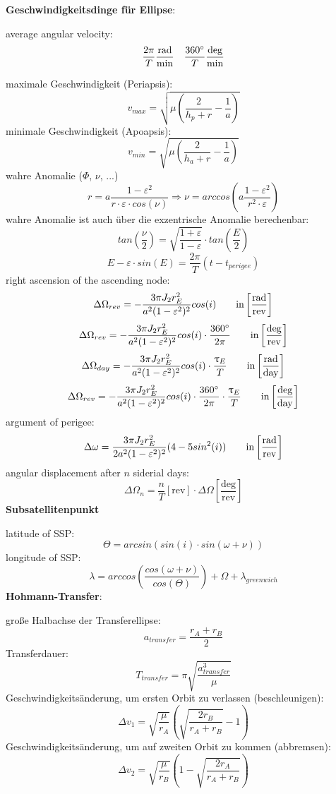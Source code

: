 \documentclass[a4paper,10pt]{article}
\newcommand{\f}{\textbf}
\begin{document}
\noindent \f{Geschwindigkeitsdinge für Ellipse}:\\
\vspace*{3pt}

average angular velocity:
\[ \frac{2\pi}{T} \frac{\text{rad}}{\text{min}} ~~~ \frac{360\degree}{T} \frac{\text{deg}}{\text{min}}\]

\noindent maximale Geschwindigkeit (Periapsis):
\[v_{max} = \sqrt{\mu\left(\frac{2}{h_p+r} -\frac{1}{a}\right)}\]
minimale Geschwindigkeit (Apoapsis):
\[v_{min} = \sqrt{\mu\left(\frac{2}{h_a+r} -\frac{1}{a}\right)}\]
wahre Anomalie ($\Phi$, $\nu$, ...)
\[r = a\frac{1-\varepsilon^2}{r\cdot \varepsilon \cdot cos(\nu)} \Rightarrow \nu = arccos\left(a\frac{1-\varepsilon^2}{r^2\cdot \varepsilon}\right)\]
wahre Anomalie ist auch über die exzentrische Anomalie berechenbar:
\[tan\left(\frac{\nu}{2}\right) = \sqrt{\frac{1+\varepsilon}{1-\varepsilon}}\cdot tan\left(\frac{E}{2}\right)\]
\[E - \varepsilon \cdot sin(E) = \frac{2\pi}{T}(t-t_{perigee})\]
right ascension of the ascending node:
\[\Delta \Omega_{rev} = -\frac{3\pi J_2r_E^2}{a^2(1-\varepsilon^2)^2}cos(i) \text{\qquad  in} \left[\frac{\text{rad}}{\text{rev}}\right]\]
\[\Delta \Omega_{rev} = -\frac{3\pi J_2r_E^2}{a^2(1-\varepsilon^2)^2}cos(i) \cdot \frac{360^{\circ}}{2\pi} \text{\qquad  in} \left[\frac{\text{deg}}{\text{rev}}\right]\]
\[\Delta \Omega_{day} = -\frac{3\pi J_2r_E^2}{a^2(1-\varepsilon^2)^2}cos(i) \cdot \frac{\uptau_E}{T} \text{\qquad  in} \left[\frac{\text{rad}}{\text{day}}\right]\]
\[\Delta \Omega_{rev} = -\frac{3\pi J_2r_E^2}{a^2(1-\varepsilon^2)^2}cos(i) \cdot \frac{360^{\circ}}{2\pi}\cdot \frac{\uptau_E}{T} \text{\qquad  in} \left[\frac{\text{deg}}{\text{day}}\right]\]
argument of perigee:
\[\Delta \omega = \frac{3\pi J_2r_E^2}{2a^2(1-\varepsilon^2)^2}(4-5sin^2(i))\text{\qquad  in} \left[\frac{\text{rad}}{\text{rev}}\right]\]
angular displacement after $n$ siderial days:
\[ \Delta\Omega_n = \frac{n}{T} [\text{rev}] \cdot \Delta\Omega \left[\frac{\text{deg}}{\text{rev}}\right]\]
\f{Subsatellitenpunkt}\\
\vspace*{5pt}

\noindent latitude of SSP: 
\[\Theta = arcsin(sin(i)\cdot sin(\omega + \nu))\]
longitude of SSP: 
\[\lambda = arccos\left(\frac{cos(\omega + \nu)}{cos(\Theta)}\right) + \Omega + \lambda_{greenwich}\]
\f{Hohmann-Transfer}:\\
\vspace*{5pt}

\noindent große Halbachse der Transferellipse:
\[a_{transfer} = \frac{r_A + r_B}{2}\]
Transferdauer: 
\[T_{transfer} = \pi \sqrt{\frac{a_{transfer}^3}{\mu}}\]
Geschwindigkeitsänderung, um ersten Orbit zu verlassen (beschleunigen): 
\[\Delta v_1 = \sqrt{\frac{\mu}{r_A}}\left(\sqrt{\frac{2r_B}{r_A + r_B}} -1 \right)\]
Geschwindigkeitsänderung, um auf zweiten Orbit zu kommen (abbremsen): 
\[\Delta v_2 = \sqrt{\frac{\mu}{r_B}}\left(1-\sqrt{\frac{2r_A}{r_A + r_B}} \right)\]
\vspace*{5pt}
\end{document}

